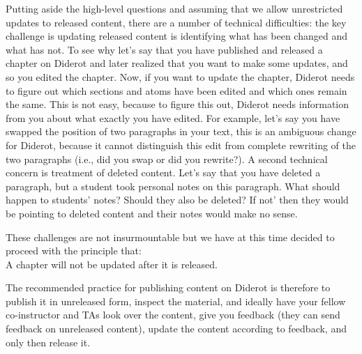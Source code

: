 Putting aside the high-level questions and assuming that we allow
unrestricted updates to released content, there are a number of
technical difficulties: the key challenge is updating released
content is identifying what has been changed and what has not.  
%
To see why let's say that you have published and released a chapter on Diderot and later realized that you want to make some updates, and so you edited the chapter.
%
Now, if you want to update the chapter,  Diderot needs to figure out which sections and atoms have been edited and which ones remain the same.  This is not easy, because to figure this out, Diderot needs information from you about what exactly you have edited.  For example, let's say you have swapped the position of two paragraphs in your text, this is an ambiguous change for Diderot, because it cannot distinguish this edit from complete rewriting of the two paragraphs (i.e., did you swap or did you rewrite?).
%
A second technical concern is treatment of deleted content.  Let's say that you have deleted a paragraph, but a student took personal notes on this paragraph.  What should happen to students' notes?  Should they also be deleted? If not' then they would be pointing to deleted content and their notes would make no sense.  

\begin{gram}
These challenges are not insurmountable but we have at this time decided to proceed with the principle that:
\\
A chapter will not be updated after it is released.
\end{gram}


\begin{gram}
The recommended practice for publishing content on Diderot is therefore to publish it in unreleased form, inspect the material, and ideally have your fellow co-instructor and TAs look over the content, give you feedback (they can send feedback on unreleased content), update the content according to feedback, and only then release it.
\end{gram}

